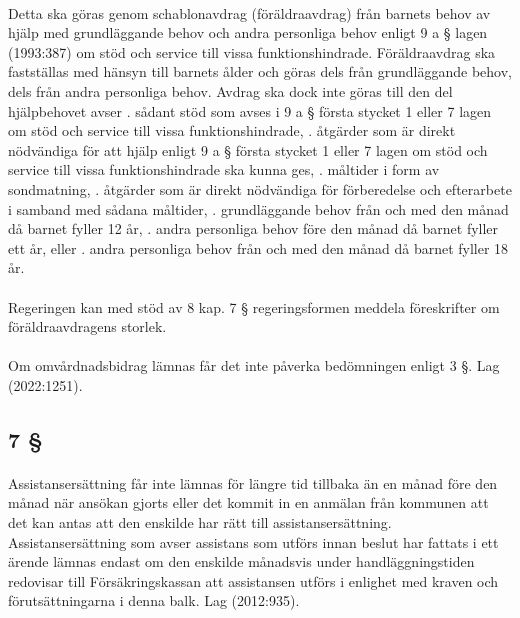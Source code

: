 \documentclass[a4paper,notitlepage,openany,10pt]{book}
\begin{document}
\paragraph*{}
Detta ska göras genom schablonavdrag (föräldraavdrag) från barnets behov av hjälp med grundläggande behov och andra personliga behov enligt 9 a § lagen (1993:387) om stöd och service till vissa funktionshindrade. Föräldraavdrag ska fastställas med hänsyn till barnets ålder och göras dels från grundläggande behov, dels från andra personliga behov. Avdrag ska dock inte göras till den del hjälpbehovet avser
. sådant stöd som avses i 9 a § första stycket 1 eller 7 lagen om stöd och service till vissa funktionshindrade,
. åtgärder som är direkt nödvändiga för att hjälp enligt 9 a § första stycket 1 eller 7 lagen om stöd och service till vissa funktionshindrade ska kunna ges,
. måltider i form av sondmatning,
. åtgärder som är direkt nödvändiga för förberedelse och efterarbete i samband med sådana måltider,
. grundläggande behov från och med den månad då barnet fyller 12 år,
. andra personliga behov före den månad då barnet fyller ett år, eller
. andra personliga behov från och med den månad då barnet fyller 18 år.
\paragraph*{}
Regeringen kan med stöd av 8 kap. 7 § regeringsformen meddela föreskrifter om föräldraavdragens storlek.
\paragraph*{}
Om omvårdnadsbidrag lämnas får det inte påverka bedömningen enligt 3 §.
Lag (2022:1251).
\subsection*{7 §}
\paragraph*{}
Assistansersättning får inte lämnas för längre tid tillbaka än en månad före den månad när ansökan gjorts eller det kommit in en anmälan från kommunen att det kan antas att den enskilde har rätt till assistansersättning.
Assistansersättning som avser assistans som utförs innan beslut har fattats i ett ärende lämnas endast om den enskilde månadsvis under handläggningstiden redovisar till Försäkringskassan att assistansen utförs i enlighet med kraven och förutsättningarna i denna balk.
Lag (2012:935).
\end{document}
